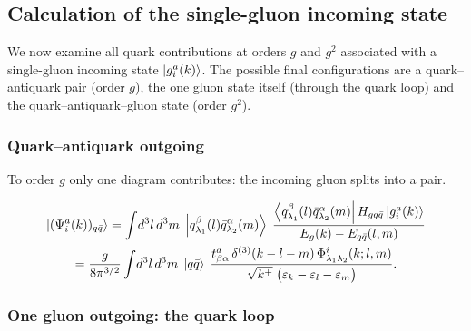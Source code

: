 \subsection{Calculation of the single-gluon incoming state}
\label{sec:wf-g}

We now examine all quark contributions at orders $g$ and $g^{2}$ associated with a single-gluon
incoming state $\left|g^{a}_{i}(k)\right\rangle$. The possible final configurations are a quark--antiquark pair
(order $g$), the one gluon state itself (through the quark loop) and the quark--antiquark--gluon
state (order $g^{2}$).

\subsubsection{Quark--antiquark outgoing}

To order $g$ only one diagram contributes: the incoming gluon splits into a pair.
\begin{center}
\end{center}
\begin{multline}
\left|(\Psi^{a}_{i}(k))_{q\bar q}\right\rangle=\int\! d^{3}l\,d^{3}m\;
\left|q^{\beta}_{\lambda_{1}}(l)\bar q^{\alpha}_{\lambda_{2}}(m)\right\rangle\;
\frac{\left\langle q^{\beta}_{\lambda_{1}}(l)\bar q^{\alpha}_{\lambda_{2}}(m)\right|H_{gq\bar q}\left|g^{a}_{i}(k)\right\rangle}
{E_{g}(k)-E_{q\bar q}(l,m)}
\\
=\frac{g}{8\pi^{3/2}}\int\! d^{3}l\,d^{3}m\;\left|q\bar q\right\rangle\;
\frac{t^{a}_{\beta\alpha}\,\delta^{(3)}(k-l-m)\,\Phi^{i}_{\lambda_{1}\lambda_{2}}(k;l,m)}
{\sqrt{k^{+}}\;\big(\varepsilon_{k}-\varepsilon_{l}-\varepsilon_{m}\big)} .
\label{eq:Pg}
\end{multline}

\subsubsection{One gluon outgoing: the quark loop}

